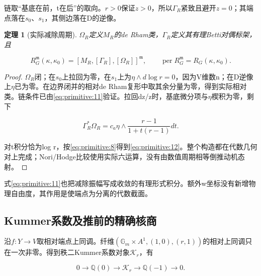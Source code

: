 \documentclass[11pt,a4paper,oneside]{ctexart}
\theoremstyle{cnplain}
\newtheorem{theorem}{定理}[section]
\theoremstyle{definition}
\theoremstyle{remark}
\numberwithin{equation}{section}
\begin{document}
链取``基底在前，t在后''的取向。\(r>0\)保证\(z>0\)，所以\(\Gamma _R\)紧致且避开\(z=0\)；其端点落在\(s_0\)、\(s_1\)，其侧边落在D的逆像。

\begin{theorem}[实际减除周期]

\label{thm:primitive:4.1} \(\Omega _R\)定义\(M_R\)的de Rham类，\(\Gamma _R\)定义其有理Betti对偶标架，且

\begin{equation}
R_G^{\mathfrak m}(\kappa,\kappa_0)
           =[M_R,[\Gamma_R],[\Omega_R]]^{\mathfrak m},\qquad
          \operatorname{per}R_G^{\mathfrak m}=R_G(\kappa,\kappa_0).           \label{eq:primitive:12}
\end{equation}

\end{theorem}

\begin{proof}

\(\Omega _R\)闭；在\(s_0\)上拉回为零，在\(s_1\)上为\(\eta \wedge d\log  r=0\)，因为V维数n；在D逆像上\(\eta \)已为零。在边界闭并的相对de Rham复形中取其余分量为零，得到实际相对类。链条件已由\eqref{eq:primitive:11}验证。拉回dz/z时，基底微分项与\(\eta \)楔积为零，剩下

\begin{equation}
\Gamma_R^*\Omega_R=c_a\eta\wedge
                  \frac{r-1}{1+t(r-1)}dt.
\end{equation}

对t积分恰为log r，按\eqref{eq:primitive:8}得到\eqref{eq:primitive:12}。整个构造都在代数几何对上完成；Nori/Hodge比较使用实际六运算\cite{tubach}，没有由数值周期相等倒推动机态射。

\end{proof}

式\eqref{eq:primitive:11}也把减除振幅写成收敛的有理形式积分。额外w坐标没有新增物理自由度，其作用是使端点为分离的代数截面。


\subsection{Kummer系数及推前的精确核商}\label{sec:primitive:5}

沿\(f:Y\to V\)取相对端点上同调。纤维\((\mathbb G_m\times A^{1},{(1,0),(r,1)})\)的相对上同调只在一次非零。得到秩二Kummer系数对象\(\mathcal K_r\)，有

\begin{equation}
0\longrightarrow\mathbb Q(0)\longrightarrow\mathcal K_r
                      \longrightarrow\mathbb Q(-1)\longrightarrow0.       \label{eq:primitive:13}
\end{equation}
\end{document}
